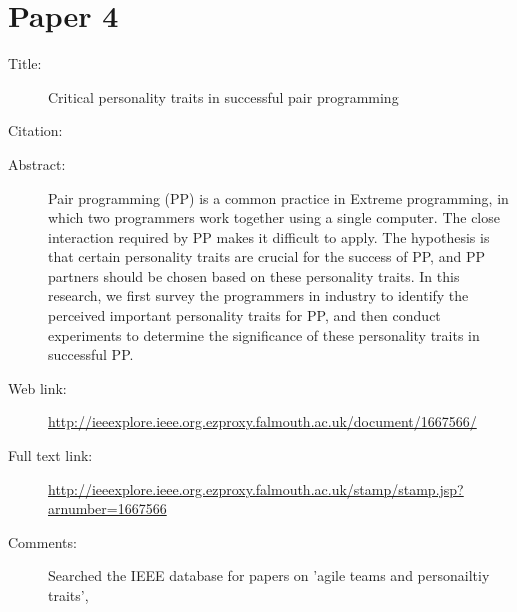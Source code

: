 \documentclass{scrartcl}
\begin{document}
\section*{Paper 4}
\begin{description}
\item[Title:] {Critical personality traits in successful pair programming}
\item[Citation:] \cite{Paper4}
\item[Abstract:]{ Pair programming (PP) is a common practice in Extreme programming, in which two programmers work together using a 
single computer. The close interaction required by PP makes it difficult to apply. The hypothesis is that certain personality traits are 
crucial for the success of PP, and PP partners should be chosen based on these personality traits. In this research, we first survey the 
programmers in industry to identify the perceived important personality traits for PP, and then conduct experiments to determine the 
significance of these personality traits in successful PP.}
\item[Web link:] \url{http://ieeexplore.ieee.org.ezproxy.falmouth.ac.uk/document/1667566/}
\item[Full text link:] \url{http://ieeexplore.ieee.org.ezproxy.falmouth.ac.uk/stamp/stamp.jsp?arnumber=1667566}
\item[Comments:] Searched the IEEE database for papers on 'agile teams and personailtiy traits', 
\end{description}
\end{document}
